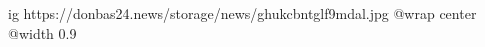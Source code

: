  
 
 
 
 

\ifcmt
  ig https://donbas24.news/storage/news/ghukcbntglf9mdal.jpg
  @wrap center
  @width 0.9
\fi
